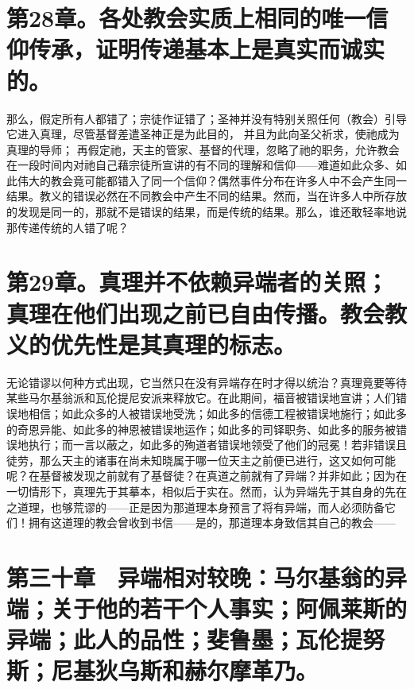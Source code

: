 
\section{第28章。各处教会实质上相同的唯一信仰传承，证明传递基本上是真实而诚实的。}

那么，假定所有人都错了；宗徒作证错了；圣神并没有特别关照任何（教会）引导它进入真理，尽管基督差遣圣神正是为此目的， 并且为此向圣父祈求，使祂成为真理的导师； 再假定祂，天主的管家、基督的代理，忽略了祂的职务，允许教会在一段时间内对祂自己藉宗徒所宣讲的有不同的理解和信仰——难道如此众多、如此伟大的教会竟可能都错入了同一个信仰？偶然事件分布在许多人中不会产生同一结果。教义的错误必然在不同教会中产生不同的结果。然而，当在许多人中所存放的发现是同一的，那就不是错误的结果，而是传统的结果。那么，谁还敢轻率地说那传递传统的人错了呢？\par


\section{第29章。真理并不依赖异端者的关照；真理在他们出现之前已自由传播。教会教义的优先性是其真理的标志。}

无论错谬以何种方式出现，它当然只在没有异端存在时才得以统治？真理竟要等待某些马尔基翁派和瓦伦提尼安派来释放它。在此期间，福音被错误地宣讲；人们错误地相信；如此众多的人被错误地受洗；如此多的信德工程被错误地施行；如此多的奇恩异能、如此多的神恩被错误地运作；如此多的司铎职务、如此多的服务被错误地执行；而一言以蔽之，如此多的殉道者错误地领受了他们的冠冕！若非错误且徒劳，那么天主的诸事在尚未知晓属于哪一位天主之前便已进行，这又如何可能呢？在基督被发现之前就有了基督徒？在真道之前就有了异端？并非如此；因为在一切情形下，真理先于其摹本，相似后于实在。然而，认为异端先于其自身的先在之道理，也够荒谬的——正是因为那道理本身预言了将有异端，而人必须防备它们！拥有这道理的教会曾收到书信——是的，那道理本身致信其自己的教会——\par


\section{第三十章　异端相对较晚：马尔基翁的异端；关于他的若干个人事实；阿佩莱斯的异端；此人的品性；斐鲁墨；瓦伦提努斯；尼基狄乌斯和赫尔摩革乃。}

